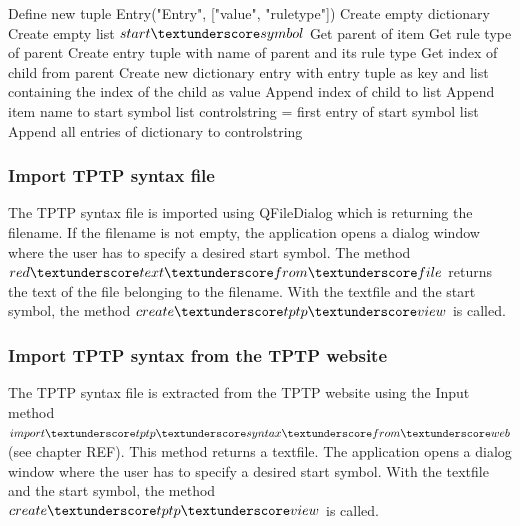 \begin{algorithm}[H]
\caption{GUI Algorithm: produce\textunderscore controlfile}
\label{alg:produceControlfile}
\begin{algorithmic}[1] 
\State Define new tuple Entry("Entry", ["value", "rule\textunderscore type"])
\State Create empty dictionary
\State Create empty list $start\textunderscore symbol$
	\State Get parent of item
		\State Get rule type of parent
		\State Create entry tuple with name of parent and its rule type
		\State Get index of child from parent
			\State Create new dictionary entry with entry tuple as key and list containing the index of the child as value
		\Else
			\State Append index of child to list
		\EndIf
		\State Append item name to start symbol list
	\EndIf
\EndFor
\State control\textunderscore string = first entry of start symbol list
\State Append all entries of dictionary to control\textunderscore string
\end{algorithmic}
\end{algorithm} 

\subsubsection{Import \ac{TPTP} syntax file}\label{sec:ImplementationGUIImportFile}

The \ac{TPTP} syntax file is imported using QFileDialog which is returning the filename. If the filename is not empty, the application opens a dialog window where the user has to specify a desired start symbol. The method $red\textunderscore text\textunderscore from\textunderscore file$ returns the text of the file belonging to the filename. With the textfile and the start symbol, the method $create\textunderscore tptp\textunderscore view$ is called.

\subsubsection{Import \ac{TPTP} syntax from the \ac{TPTP} website}\label{sec:ImplementationGUIImportInternet}

The \ac{TPTP} syntax file is extracted from the \ac{TPTP} website using the Input method $import\textunderscore tptp\textunderscore syntax\textunderscore from\textunderscore web$ (see chapter REF). This method returns a textfile. The application opens a dialog window where the user has to specify a desired start symbol. With the textfile and the start symbol, the method $create\textunderscore tptp\textunderscore view$ is called.


